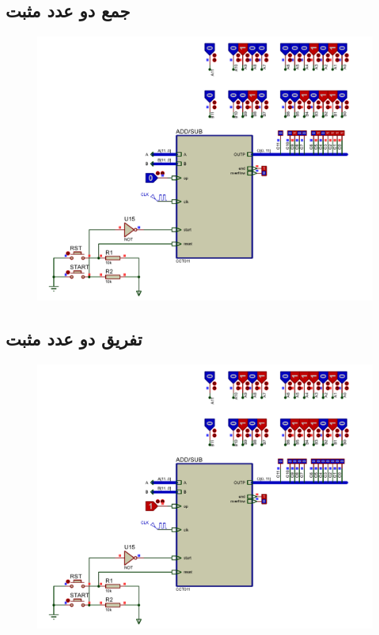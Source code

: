 \documentclass{article}
\begin{document}
\subsection{جمع دو عدد مثبت}
\begin{figure}[H]
	\centering
	\includegraphics[scale=0.5]{./graphics/tests/PosPlusPos}
\end{figure}

\subsection{تفریق دو عدد مثبت}
\begin{figure}[H]
	\centering
	\includegraphics[scale=0.5]{./graphics/tests/PosMinusPosEqual}
\end{figure}
\end{document}
